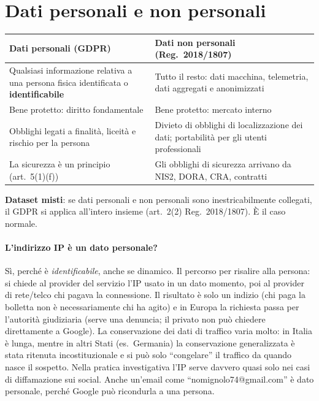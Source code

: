 \section{Dati personali e non personali}
\begin{center}
\small
\begin{tabularx}{\linewidth}{X X}
\toprule
\textbf{Dati personali (GDPR)} & \textbf{Dati non personali (Reg.~2018/1807)}\\ \midrule
Qualsiasi informazione relativa a una persona fisica identificata o \textbf{identificabile} &
  Tutto il resto: dati macchina, telemetria, dati aggregati e anonimizzati\\
Bene protetto: diritto fondamentale & Bene protetto: mercato interno\\
Obblighi legati a finalità, liceità e rischio per la persona & Divieto di obblighi di localizzazione
  dei dati; portabilità per gli utenti professionali\\
La sicurezza è un principio (art.~5(1)(f)) & Gli obblighi di sicurezza arrivano da NIS2, DORA, CRA,
  contratti\\ \bottomrule
\end{tabularx}
\end{center}
\textbf{Dataset misti}: se dati personali e non personali sono inestricabilmente collegati, il GDPR si
applica all'intero insieme (art.~2(2) Reg.~2018/1807). È il caso normale.

\paragraph{L'indirizzo IP è un dato personale?} Sì, perché è \emph{identificabile}, anche se dinamico.
Il percorso per risalire alla persona: si chiede al provider del servizio l'IP usato in un dato
momento, poi al provider di rete/telco chi pagava la connessione. Il risultato è solo un indizio (chi
paga la bolletta non è necessariamente chi ha agito) e in Europa la richiesta passa per l'autorità
giudiziaria (serve una denuncia; il privato non può chiedere direttamente a Google). La conservazione
dei dati di traffico varia molto: in Italia è lunga, mentre in altri Stati (es.\ Germania) la
conservazione generalizzata è stata ritenuta incostituzionale e si può solo ``congelare'' il traffico
da quando nasce il sospetto. Nella pratica investigativa l'IP serve davvero quasi solo nei casi di
diffamazione sui social. Anche un'email come ``nomignolo74@gmail.com'' è dato personale, perché
Google può ricondurla a una persona.

